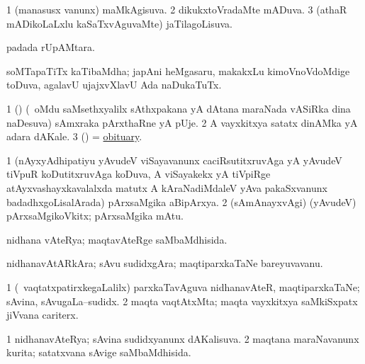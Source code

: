 \bentry
{}
\gl{\gu}
\bmng
\bnum
\num{1} (manasusx \mo vanunx) maMkAgisuva. 
\num{2} dikukxtoVradaMte mADuva. 
\num{3} (athaR mADikoLaLxlu kaSaTxvAguvaMte) jaTilagoLisuva. 
\enum
\emng
\eentry

\bentry
{}
\gl{\nA}
\bmng
{} padada rUpAMtara. 
\emng
\eentry

\bentry
{}
\gl{\nA}
\bmng
soMTapaTiTx kaTibaMdha; japAni heMgasaru, makakxLu kimoVnoVdoMdige toDuva, agalavU ujajxvXlavU Ada naDukaTuTx. 
\emng
\eentry

\bentry
{}
\gl{\nA}
\bmng
\bnum
\num{1} (\ca) (\kanmu\ oMdu saMsethxyalilx sAthxpakana yA dAtana maraNada vASiRka dina naDesuva) sAmxraka pArxthaRne yA pUje. 
\num{2} A vayxkitxya satatx dinAMka yA adara dAKale. 
\num{3} (\AmA) = \hyperlink{obituary(1)}{obituary}. 
\enum
\emng
\eentry

\bentry
{}
\gl{\nA}
\bmng
\bnum
\num{1} (nAyxyAdhipatiyu yAvudeV viSayavanunx caciRsutitxruvAga yA yAvudeV tiVpuR koDutitxruvAga koDuva, A viSayakekx yA tiVpiRge atAyxvashayxkavalalxda matutx A kAraNadiMdaleV yAva pakaSxvanunx badadhxgoLisalArada) pArxsaMgika aBipArxya. 
\num{2} (sAmAnayxvAgi) (yAvudeV) pArxsaMgikoVkitx; pArxsaMgika mAtu. 
\enum
\emng
\eentry

\bentry
{}
\gl{\gu}
\bmng
nidhana vAteRya; maqtavAteRge saMbaMdhisida. 
\emng
\eentry

\bentry
{}
\gl{\nA}
\bmng
nidhanavAtARkAra; sAvu sudidxgAra; maqtiparxkaTaNe bareyuvavanu. 
\emng
\eentry

\bentry
{}
\gl{\nA}
\bmng
\bnum
\num{1} (\kanmu\ vaqtatxpatirxkegaLalilx) parxkaTavAguva nidhanavAteR, maqtiparxkaTaNe; sAvina, sAvugaLa--sudidx. 
\num{2} maqta vaqtAtxMta; maqta vayxkitxya saMkiSxpatx jiVvana cariterx. 
\enum
\emng
\eentry

\bentry
{}
\gl{\gu}
\bmng
\bnum
\num{1} nidhanavAteRya; sAvina sudidxyanunx dAKalisuva. 
\num{2} maqtana maraNavanunx kurita; satatxvana sAvige saMbaMdhisida. 
\enum
\emng
\eentry

